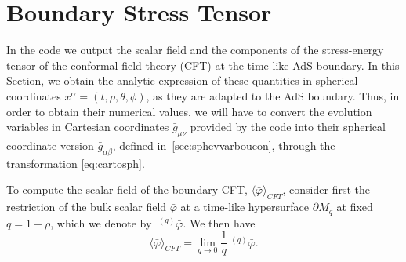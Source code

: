 \documentclass[a4paper,11pt]{article}
\begin{document}
\section{Boundary Stress Tensor}
\label{sec:bouset2}

In the code we output the scalar field and the components of the stress-energy tensor of the conformal field theory (CFT) at the time-like AdS boundary. In this Section, we obtain the analytic expression of these quantities in spherical coordinates $x^\alpha=(t,\rho,\theta,\phi)$, as they are adapted to the AdS boundary. Thus, in order to obtain their numerical values, we will have to convert the evolution variables in Cartesian coordinates $\bar{g}_{\mu\nu}$ provided by the code into their spherical coordinate version $\bar{g}_{\alpha\beta}$, defined in~\ref{sec:sphevvarboucon}, through the transformation \eqref{eq:cartosph}.

To compute the scalar field of the boundary CFT, $\langle \bar{\varphi}\rangle_{CFT}$, consider first the restriction of the bulk scalar field $\bar{\varphi}$ at a time-like hypersurface $\partial M_q$ at fixed $q=1-\rho$, which we denote by $\;^{(q)}\bar{\varphi}$. We then have 
\begin{equation}
\langle \bar{\varphi}\rangle_{CFT}=\lim_{q\to0}\frac{1}{q}  \;^{(q)}\bar{\varphi}.
\end{equation}
\end{document}

